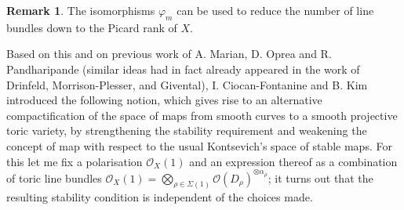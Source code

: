 \documentclass[11pt]{amsart}
\newcommand{\OO}{\mathcal{O}}
\theoremstyle{definition}
\theoremstyle{definition}
\newtheorem{rmk}[thm]{Remark}
\begin{document}
\begin{rmk}
 The isomorphisms $\varphi_m$ can be used to reduce the number of line bundles down to the Picard rank of $X$.
\end{rmk}

Based on this and on previous work of A. Marian, D. Oprea and R. Pandharipande \cite{MOP} (similar ideas had in fact already appeared in the work of Drinfeld, Morrison-Plesser, and Givental), I. Ciocan-Fontanine and B. Kim introduced the following notion, which gives rise to an alternative compactification of the space of maps from smooth curves to a smooth projective toric variety, by strengthening the stability requirement and weakening the concept of map with respect to the usual Kontsevich's space of stable maps. For this let me fix a polarisation $\OO_X(1)$ and an expression thereof as a combination of toric line bundles $\OO_X(1)=\bigotimes_{\rho\in\Sigma(1)}\OO(D_\rho)^{\otimes \alpha_\rho}$; it turns out that the resulting stability condition is independent of the choices made.
\end{document}
